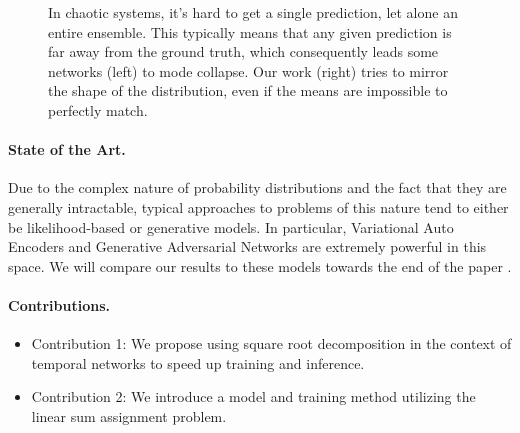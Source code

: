 \documentclass{article}
\begin{document}
\begin{figure}
    \centering
    \caption{
        In chaotic systems, it's hard to get a single prediction, let alone an entire ensemble. This typically means that any given prediction is far away from the ground truth, which consequently leads some networks (left) to mode collapse. Our work (right) tries to mirror the shape of the distribution, even if the means are impossible to perfectly match.
    }
    \label{separate_distributions}
\end{figure}

\paragraph{State of the Art.}
Due to the complex nature of probability distributions and the fact that they are generally intractable, typical approaches to problems of this nature tend to either be likelihood-based or generative models. In particular, Variational Auto Encoders and Generative Adversarial Networks are extremely powerful in this space. We will compare our results to these models towards the end of the paper \cite{goodfellow2014generative, kingma2022autoencoding, doersch2021tutorial}.

\paragraph{Contributions.}
\begin{itemize}
    \item Contribution 1: We propose using square root decomposition in the context of temporal networks to speed up training and inference.
    \item Contribution 2: We introduce a model and training method utilizing the linear sum assignment problem.
\end{itemize}
\end{document}
